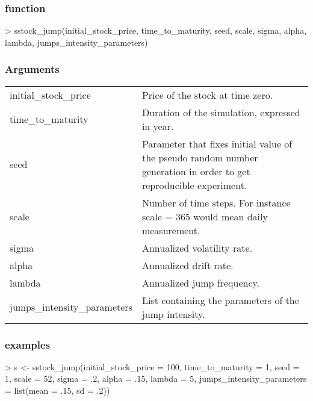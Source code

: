 \documentclass[12pt]{report}
\begin{document}
\begin{appendices}
\subsubsection*{function}

\begin{Schunk}
\begin{Sinput}
> sstock_jump(initial_stock_price, time_to_maturity, 
        seed, scale, sigma, alpha, lambda, jumps_intensity_parameters)
\end{Sinput}
\end{Schunk}

\subsubsection*{Arguments}

\begin{tabularx}{\textwidth}{lX}
  initial\_stock\_price & Price of the stock at time zero.\\
  time\_to\_maturity & Duration of the simulation, expressed in year.\\
  seed & Parameter that fixes initial value of the pseudo random number generation in order to get reproducible experiment. \\
  scale & Number of time steps. For instance scale = 365 would mean daily measurement.\\
  sigma & Annualized volatility rate. \\
  alpha & Annualized drift rate.\\
  lambda & Annualized jump frequency. \\
  jumps\_intensity\_parameters & List containing the parameters of the jump intensity. 
\end{tabularx}

\subsubsection*{examples}
\label{sec:r:time:geometric:ex}

\begin{Schunk}
\begin{Sinput}
> s <- sstock_jump(initial_stock_price = 100,
                  time_to_maturity = 1,
                  seed = 1,
                  scale = 52,
                  sigma = .2,
                  alpha = .15,
                  lambda = 5,
                  jumps_intensity_parameters = list(mean = .15, sd = .2))
\end{Sinput}
\end{Schunk}



\end{appendices}
\end{document}
